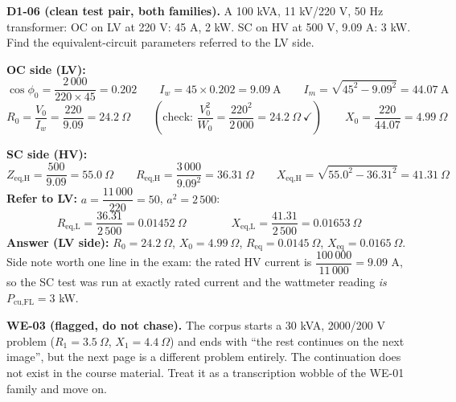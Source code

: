 \documentclass[11pt]{article}
\newcommand{\tagline}[1]{\textbf{\color{copper}#1}}
\begin{document}
\vspace{2pt}

\tagline{D1-06 (clean test pair, both families).} A 100 kVA, 11 kV/220 V, 50 Hz transformer: OC on LV at 220 V: 45 A, 2 kW. SC on HV at 500 V, 9.09 A: 3 kW. Find the equivalent-circuit parameters referred to the LV side.

\textbf{OC side (LV):}
\[
\cos\phi_0 = \frac{2\,000}{220 \times 45} = 0.202
\qquad
I_w = 45 \times 0.202 = 9.09\ \text{A}
\qquad
I_m = \sqrt{45^{2} - 9.09^{2}} = 44.07\ \text{A}
\]
\[
R_0 = \frac{V_0}{I_w} = \frac{220}{9.09} = 24.2\ \Omega
\qquad
\left(\text{check: } \frac{V_0^{2}}{W_0} = \frac{220^{2}}{2\,000} = 24.2\ \Omega\ \checkmark\right)
\qquad
X_0 = \frac{220}{44.07} = 4.99\ \Omega
\]

\textbf{SC side (HV):}
\[
Z_{\text{eq,H}} = \frac{500}{9.09} = 55.0\ \Omega
\qquad
R_{\text{eq,H}} = \frac{3\,000}{9.09^{2}} = 36.31\ \Omega
\qquad
X_{\text{eq,H}} = \sqrt{55.0^{2} - 36.31^{2}} = 41.31\ \Omega
\]
\textbf{Refer to LV:} $a = \dfrac{11\,000}{220} = 50$, $a^{2} = 2\,500$:
\[
R_{\text{eq,L}} = \frac{36.31}{2\,500} = 0.01452\ \Omega
\qquad\qquad
X_{\text{eq,L}} = \frac{41.31}{2\,500} = 0.01653\ \Omega
\]
\textbf{Answer (LV side):} $R_0 = 24.2\ \Omega$, $X_0 = 4.99\ \Omega$, $R_{\text{eq}} = 0.0145\ \Omega$, $X_{\text{eq}} = 0.0165\ \Omega$. Side note worth one line in the exam: the rated HV current is $\dfrac{100\,000}{11\,000} = 9.09$ A, so the SC test was run at exactly rated current and the wattmeter reading \emph{is} $P_{\text{cu,FL}} = 3$ kW.

\vspace{2pt}

\tagline{WE-03 (flagged, do not chase).} The corpus starts a 30 kVA, 2000/200 V problem ($R_1 = 3.5\ \Omega$, $X_1 = 4.4\ \Omega$) and ends with ``the rest continues on the next image'', but the next page is a different problem entirely. The continuation does not exist in the course material. Treat it as a transcription wobble of the WE-01 family and move on.

\hrulefill
\end{document}
